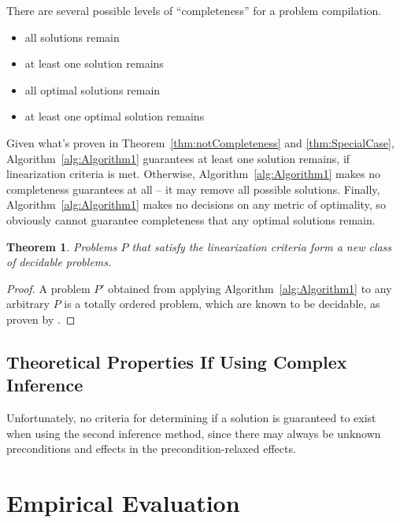 \documentclass[letterpaper]{article} %
\newtheorem{theorem}{Theorem}
\begin{document}
There are several possible levels of \enquote{completeness} for a problem compilation.
\begin{itemize}
	\item all solutions remain 
	\item at least one solution remains 
	\item all optimal solutions remain
	\item at least one optimal solution remains 	
\end{itemize}
Given what's proven in Theorem~\ref{thm:notCompleteness} and \ref{thm:SpecialCase}, Algorithm~\ref{alg:Algorithm1} guarantees at least one solution remains, if linearization criteria is met. Otherwise, Algorithm~\ref{alg:Algorithm1} makes no completeness guarantees at all -- it may remove all possible solutions. Finally, Algorithm~\ref{alg:Algorithm1} makes no decisions on any metric of optimality, so obviously cannot guarantee completeness that any optimal solutions remain.


\begin{theorem}\label{thm:newClass}
	Problems $P$ that satisfy the linearization criteria form a new class of decidable problems.
\end{theorem}
\begin{proof}
	A problem $P'$ obtained from applying Algorithm~\ref{alg:Algorithm1} to any arbitrary $P$ is a totally ordered problem, which are known to be decidable, as proven by \cite{Alford2015TightHTNBounds}.  
\end{proof}


\subsection{Theoretical Properties If Using Complex Inference}
Unfortunately, no criteria for determining if a solution is guaranteed to exist when using the second inference method, since there may always be unknown preconditions and effects in the precondition-relaxed effects.




\section{Empirical Evaluation}
\end{document}

